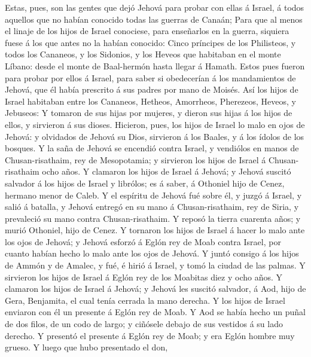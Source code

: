  Estas, pues, son las gentes que dejó Jehová para probar
con ellas á Israel, á todos aquellos que no habían conocido todas las
guerras de Canaán;  Para que al menos el linaje de los
hijos de Israel conociese, para enseñarlos en la guerra, siquiera fuese
á los que antes no la habían conocido:  Cinco príncipes de
los Philisteos, y todos los Cananeos, y los Sidonios, y los Heveos que
habitaban en el monte Líbano: desde el monte de Baal-hermón hasta llegar
á Hamath.  Estos pues fueron para probar por ellos á
Israel, para saber si obedecerían á los mandamientos de Jehová, que él
había prescrito á sus padres por mano de Moisés.  Así los
hijos de Israel habitaban entre los Cananeos, Hetheos, Amorrheos,
Pherezeos, Heveos, y Jebuseos:  Y tomaron de sus hijas por
mujeres, y dieron sus hijas á los hijos de ellos, y sirvieron á sus
dioses.  Hicieron, pues, los hijos de Israel lo malo en
ojos de Jehová: y olvidados de Jehová su Dios, sirvieron á los Baales, y
á los ídolos de los bosques.  Y la saña de Jehová se
encendió contra Israel, y vendiólos en manos de Chusan-risathaim, rey de
Mesopotamia; y sirvieron los hijos de Israel á Chusan-risathaim ocho
años.  Y clamaron los hijos de Israel á Jehová; y Jehová
suscitó salvador á los hijos de Israel y librólos; es á saber, á
Othoniel hijo de Cenez, hermano menor de Caleb.  Y el
espíritu de Jehová fué sobre él, y juzgó á Israel, y salió á batalla, y
Jehová entregó en su mano á Chusan-risathaim, rey de Siria, y prevaleció
su mano contra Chusan-risathaim.  Y reposó la tierra
cuarenta años; y murió Othoniel, hijo de Cenez.  Y
tornaron los hijos de Israel á hacer lo malo ante los ojos de Jehová; y
Jehová esforzó á Eglón rey de Moab contra Israel, por cuanto habían
hecho lo malo ante los ojos de Jehová.  Y juntó consigo á
los hijos de Ammón y de Amalec, y fué, é hirió á Israel, y tomó la
ciudad de las palmas.  Y sirvieron los hijos de Israel á
Eglón rey de los Moabitas diez y ocho años.  Y clamaron
los hijos de Israel á Jehová; y Jehová les suscitó salvador, á Aod, hijo
de Gera, Benjamita, el cual tenía cerrada la mano derecha. Y los hijos
de Israel enviaron con él un presente á Eglón rey de Moab.
 Y Aod se había hecho un puñal de dos filos, de un codo
de largo; y ciñósele debajo de sus vestidos á su lado derecho.
 Y presentó el presente á Eglón rey de Moab; y era Eglón
hombre muy grueso.  Y luego que hubo presentado el don,
